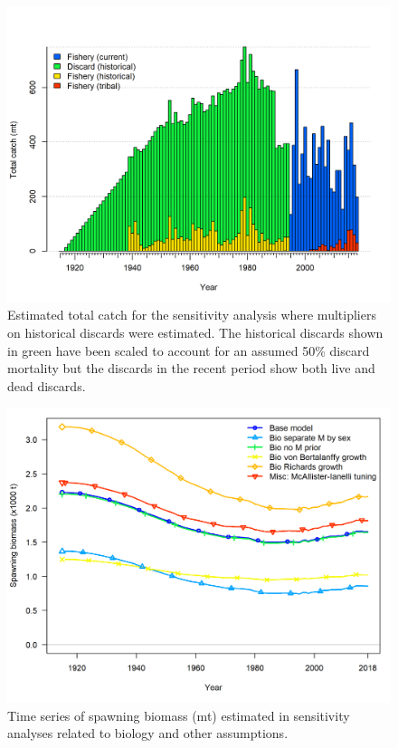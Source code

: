 \documentclass[12pt,]{article}
\begin{document}
\begin{figure}
\centering
\includegraphics{Figures/catch_multiplier_total_catch.png}
\caption{Estimated total catch for the sensitivity analysis where
multipliers on historical discards were estimated. The historical
discards shown in green have been scaled to account for an assumed 50\%
discard mortality but the discards in the recent period show both live
and dead discards. \label{fig:catch_multiplier_total_catch}}
\end{figure}

\begin{figure}
\centering
\includegraphics{Figures/sens.bio_and_misc_compare1_spawnbio.png}
\caption{Time series of spawning biomass (mt) estimated in sensitivity
analyses related to biology and other assumptions.
\label{fig:Sensitivity_bio_and_misc}}
\end{figure}
\end{document}
